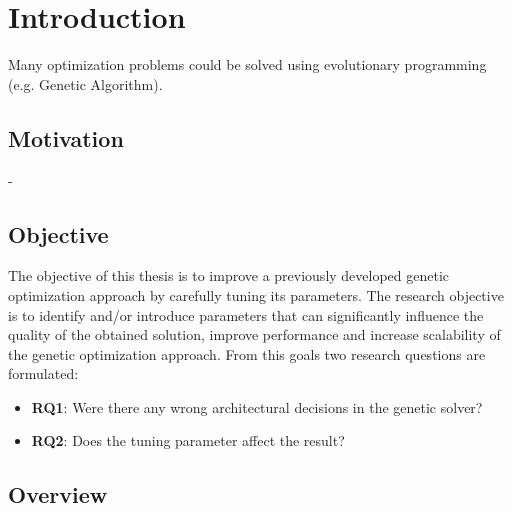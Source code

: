 \chapter{Introduction}\label{intro}
Many optimization problems could be solved using evolutionary programming (e.g. Genetic Algorithm). 

\section{Motivation}
- 


\section{Objective}
The objective of this thesis is to improve a previously developed genetic optimization approach by carefully tuning its parameters. The research objective is to identify and/or introduce parameters that can significantly influence the quality of the obtained solution, improve performance and increase scalability of the genetic optimization approach. From this goals two research questions are formulated:
\begin{itemize}
	\item \textbf{RQ1}: Were there any wrong architectural decisions in the genetic solver?
	\item \textbf{RQ2}: Does the tuning parameter affect the result?
\end{itemize}



  	
\section{Overview}

